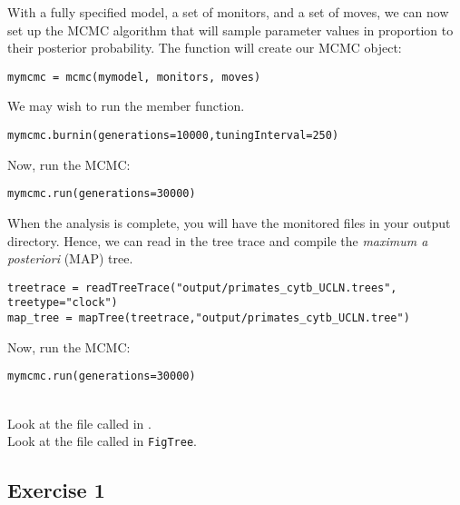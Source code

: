 With a fully specified model, a set of monitors, and a set of moves, we can now set up the MCMC algorithm that will sample parameter values in proportion to their posterior probability. 
The  function will create our MCMC object:
{\tt \begin{snugshade*}
\begin{lstlisting}
mymcmc = mcmc(mymodel, monitors, moves)
\end{lstlisting}
\end{snugshade*}}

We may wish to run the  member function.
{\tt \begin{snugshade*}
\begin{lstlisting}
mymcmc.burnin(generations=10000,tuningInterval=250)
\end{lstlisting}
\end{snugshade*}}

Now, run the MCMC:
{\tt \begin{snugshade*}
\begin{lstlisting}
mymcmc.run(generations=30000)
\end{lstlisting}
\end{snugshade*}}

When the analysis is complete, you will have the monitored files in your output directory.
Hence, we can read in the tree trace and compile the \emph{maximum a posteriori} (MAP) tree.
{\tt \begin{snugshade*}
\begin{lstlisting}
treetrace = readTreeTrace("output/primates_cytb_UCLN.trees", treetype="clock")
map_tree = mapTree(treetrace,"output/primates_cytb_UCLN.tree")
\end{lstlisting}
\end{snugshade*}}

Now, run the MCMC:
{\tt \begin{snugshade*}
\begin{lstlisting}
mymcmc.run(generations=30000)
\end{lstlisting}
\end{snugshade*}}

\noindent \\ \impmark Look at the file called  in \Tracer.
\noindent \\ \impmark Look at the file called  in \texttt{FigTree}.


\subsection{Exercise 1}

